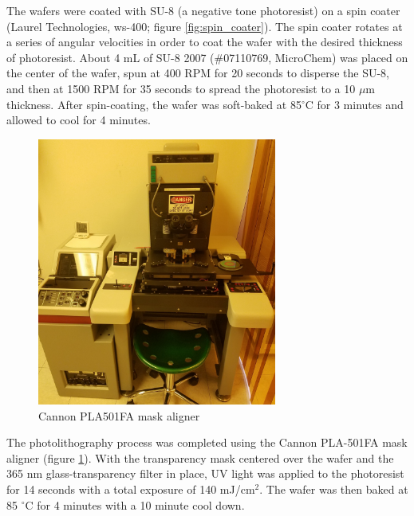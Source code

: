 \par The wafers were coated with SU-8 (a negative tone photoresist) on a spin coater (Laurel Technologies, ws-400; figure \ref{fig:spin_coater}). The spin coater rotates at a series of angular velocities in order to coat the wafer with the desired thickness of photoresist. About 4 mL of SU-8 2007 (\#07110769, MicroChem) was placed on the center of the wafer, spun at 400 RPM for 20 seconds to disperse the SU-8, and then at 1500 RPM for 35 seconds to spread the photoresist to a 10 $\mu$m thickness. After spin-coating, the wafer was soft-baked at 85$^\circ$C for 3 minutes and allowed to cool for 4 minutes.

\begin{figure}[h]
    \centering
    \includegraphics[width=0.7\textwidth]{images/aligner.jpg}
    \caption{Cannon PLA501FA mask aligner}
    \label{fig:mask_aligner}
\end{figure}

\par The photolithography process was completed using the Cannon PLA-501FA mask aligner (figure \ref{fig:mask_aligner}). With the transparency mask centered over the wafer and the 365 nm glass-transparency filter in place, UV light was applied to the photoresist for 14 seconds with a total exposure of 140 mJ/cm$^2$. The wafer was then baked at 85 $^\circ$C for 4 minutes with a 10 minute cool down. 

